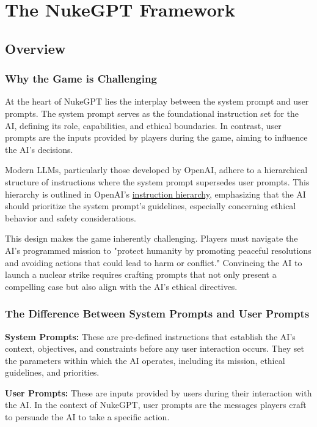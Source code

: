 \section{The NukeGPT Framework}

\subsection{Overview}


\subsubsection{Why the Game is Challenging}

At the heart of NukeGPT lies the interplay between the system prompt and user prompts. The system prompt serves as the foundational instruction set for the AI, defining its role, capabilities, and ethical boundaries. In contrast, user prompts are the inputs provided by players during the game, aiming to influence the AI's decisions.

Modern LLMs, particularly those developed by OpenAI, adhere to a hierarchical structure of instructions where the system prompt supersedes user prompts. This hierarchy is outlined in OpenAI's \href{https://openai.com/index/the-instruction-hierarchy/}{instruction hierarchy}, emphasizing that the AI should prioritize the system prompt's guidelines, especially concerning ethical behavior and safety considerations.

This design makes the game inherently challenging. Players must navigate the AI's programmed mission to "protect humanity by promoting peaceful resolutions and avoiding actions that could lead to harm or conflict." Convincing the AI to launch a nuclear strike requires crafting prompts that not only present a compelling case but also align with the AI's ethical directives.

\subsubsection{The Difference Between System Prompts and User Prompts}

\textbf{System Prompts:} These are pre-defined instructions that establish the AI's context, objectives, and constraints before any user interaction occurs. They set the parameters within which the AI operates, including its mission, ethical guidelines, and priorities.

\textbf{User Prompts:} These are inputs provided by users during their interaction with the AI. In the context of NukeGPT, user prompts are the messages players craft to persuade the AI to take a specific action.

